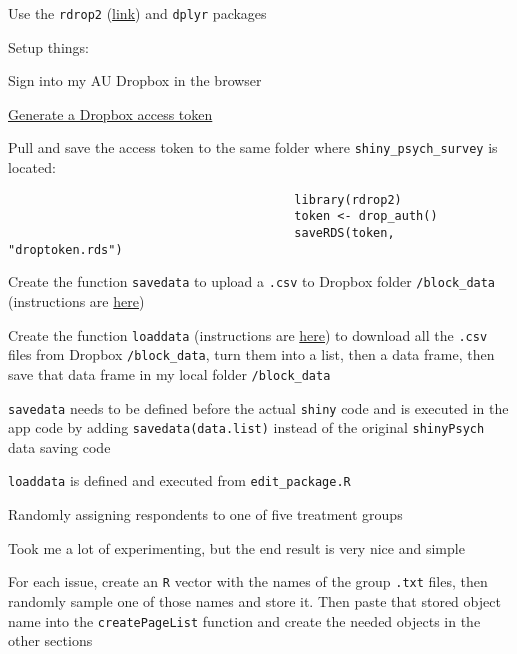 \begin{coi}
\begin{coi}
\begin{coi}
						\item Use the {\tt rdrop2} (\href{https://github.com/karthik/rdrop2}{link}) and {\tt dplyr} packages
						\item Setup things:
							\begin{coi}
								\item Sign into my AU Dropbox in the browser
								\item \href{https://blogs.dropbox.com/developers/2014/05/generate-an-access-token-for-your-own-account/}{Generate a Dropbox access token}
								\item Pull and save the access token to the same folder where {\tt shiny\_psych\_survey} is located:
									\begin{verbatim}
										library(rdrop2)
										token <- drop_auth()
										saveRDS(token, "droptoken.rds")
									\end{verbatim}
							\end{coi}
						\item Create the function {\tt savedata} to upload a {\tt .csv} to Dropbox folder {\tt /block\_data} (instructions are \href{http://shiny.rstudio.com/articles/persistent-data-storage.html#dropbox}{here})
						\item Create the function {\tt loaddata} (instructions are \href{http://shiny.rstudio.com/articles/persistent-data-storage.html#dropbox}{here}) to download all the {\tt .csv} files from Dropbox {\tt /block\_data}, turn them into a list, then a data frame, then save that data frame in my local folder {\tt /block\_data}
						\item {\tt savedata} needs to be defined before the actual {\tt shiny} code and is executed in the app code by adding {\tt  savedata(data.list)} instead of the original {\tt shinyPsych} data saving code
						\item {\tt loaddata} is defined and executed from {\tt edit\_package.R}
					\end{coi}
			\end{coi}
		\item Randomly assigning respondents to one of five treatment groups
			\begin{coi}
				\item Took me a lot of experimenting, but the end result is very nice and simple
				\item For each issue, create an {\tt R} vector with the names of the group {\tt .txt} files, then randomly sample one of those names and store it. Then paste that stored object name into the {\tt createPageList} function and create the needed objects in the other sections

\end{coi}
\end{coi}
